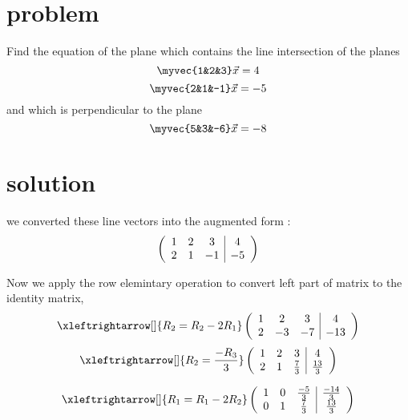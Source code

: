 \documentclass[journal,12pt,twocolumn]{IEEEtran}
\begin{document}
\section{problem}
Find the equation of the plane which contains the line intersection of the planes
\begin{equation}
	\myvec{1&2&3}\vec{x} = 4
\end{equation}
\begin{equation}
	\myvec{2&1&-1}\vec{x} = -5
\end{equation}
and which is perpendicular to the plane
\begin{equation}
\myvec{5&3&-6}\vec{x} = -8
\end{equation}

\section{solution}
 we converted these line vectors into the augmented form :
\begin{equation}
\centering
\left(
\begin{array}{ccc|c}
1 & 2 & 3 & 4\\
2 & 1 & -1 &-5\\
\end{array}
\right)
\end{equation}


Now we apply the row elemintary operation to convert left part of matrix to the identity matrix,
\begin{align}
\xleftrightarrow[]{R_2 = R_2 - 2R_1}\centering
\left(
\begin{array}{ccc|c}
	1 & 2 & 3 & 4\\
	2 & -3 & -7 &-13\\
\end{array}
\right)
\end{align}
\begin{align}
\xleftrightarrow[]{R_2 = \frac{-R_3}{3}}\centering
\left(
\begin{array}{ccc|c}
	1 & 2 & 3 & 4\\
	2 & 1 & \frac{7}{3} &\frac{13}{3}\\
\end{array}
\right)
\end{align}

\begin{align}
\xleftrightarrow[]{R_1 = R_1-2R_2}\centering
\left(
\begin{array}{ccc|c}
	1 & 0 & \frac{-5}{3} & \frac{-14}{3}\\
	0 & 1 & \frac{7}{3} &\frac{13}{3}\\
\end{array}
\right)
\end{align}
\end{document}
